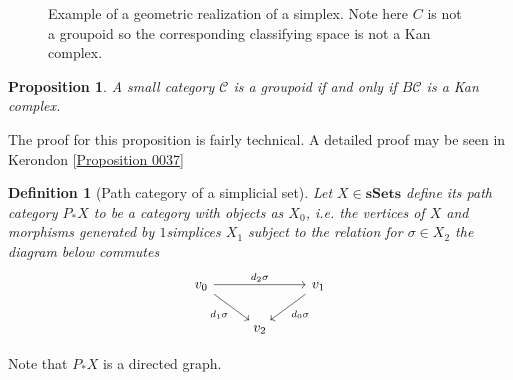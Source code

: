 \documentclass[12pt]{report}
\numberwithin{equation}{section}
\newtheorem{definition}[dummy]{Definition}
\newtheorem{proposition}[dummy]{Proposition}
\begin{document}
\begin{figure}[!htb]
		
		
	
		\caption{Example of a geometric realization of a simplex. Note here $C$ is not a groupoid so the corresponding classifying space is not a Kan complex.}
		\label{fig:exofnerve}
	\end{figure}

	
	
	\begin{proposition}
		A small category $\mathcal{C}$ is a groupoid if and only if $B\mathcal{C}$ is a Kan complex.
	\end{proposition} 
	The proof for this proposition is fairly technical. A detailed proof may be seen in Kerondon \cite{kerodon}[\href{https://kerodon.net/tag/0037}{Proposition 0037}]

	\begin{definition}[Path category of a simplicial set]
		Let \(X \in \mathbf{sSets}\) define its path category \(P_*X \) to be a category with objects as \(X_0\), i.e. the vertices of \(X\) and morphisms generated by \(1\)simplices \(X_1\) subject to the relation for \(\sigma \in X_2\) the diagram below commutes
		\[\begin{tikzcd}
			{v_0} && {v_1} \\
			& {v_2}
			\arrow["{d_2\sigma}", from=1-1, to=1-3]
			\arrow["{d_1\sigma}"', from=1-1, to=2-2]
			\arrow["{d_0\sigma}", from=1-3, to=2-2]
		\end{tikzcd}\]
	\end{definition}
	Note that $P_*X$ is a directed graph.	
\end{document}
